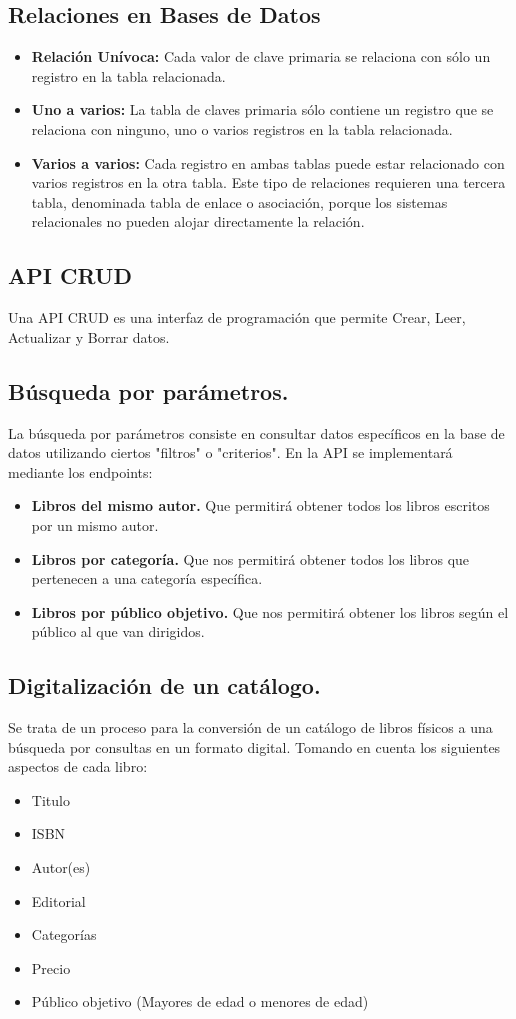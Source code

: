 \documentclass[12pt]{article}
\begin{document}
\subsection*{Relaciones en Bases de Datos}
\begin{itemize}
    \item \textbf{Relación Unívoca:} Cada valor de clave primaria se relaciona con sólo un registro en la tabla relacionada.
    \item \textbf{Uno a varios:} La tabla de claves primaria sólo contiene un registro que se relaciona con ninguno, uno o varios registros en la tabla relacionada.
    \item \textbf{Varios a varios:} Cada registro en ambas tablas puede estar relacionado con varios registros en la otra tabla. Este tipo de relaciones requieren una tercera tabla, denominada tabla de enlace o asociación, porque los sistemas relacionales no pueden alojar directamente la relación. \cite{ref5}
\end{itemize}

\subsection*{API CRUD}
Una API CRUD es una interfaz de programación que permite Crear, Leer, Actualizar y Borrar datos. \cite{ref6}

\subsection*{Búsqueda por parámetros.}
La búsqueda por parámetros consiste en consultar datos específicos en la base de datos utilizando ciertos "filtros" o "criterios". En la API se implementará mediante los endpoints:
\begin{itemize}
    \item \textbf{Libros del mismo autor.} Que permitirá obtener todos los libros escritos por un mismo autor.
    \item \textbf{Libros por categoría.} Que nos permitirá obtener todos los libros que pertenecen a una categoría específica.
    \item \textbf{Libros por público objetivo.} Que nos permitirá obtener los libros según el público al que van dirigidos.
\end{itemize}

\subsection*{Digitalización de un catálogo.}
Se trata de un proceso para la conversión de un catálogo de libros físicos a una búsqueda por consultas en un formato digital. 
Tomando en cuenta los siguientes aspectos de cada libro:
\begin{itemize}
   \item Titulo
   \item ISBN
   \item Autor(es)
   \item Editorial
   \item Categorías
   \item Precio
   \item Público objetivo (Mayores de edad o menores de edad) 
\end{itemize}
\end{document}
